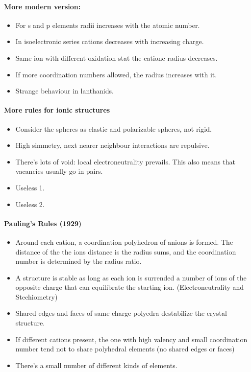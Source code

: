 \paragraph{More modern version: }

\begin{itemize}
    \item For s and p elements radii increases with the atomic number.
    \item In isoelectronic series cations decreases with increasing charge.
    \item Same ion with different oxidation stat the cationc radius decreases.
    \item If more coordination numbers allowed, the radius increases with it.
    \item Strange behaviour in lanthanids.
\end{itemize}

\paragraph{More rules for ionic structures}

\begin{itemize}
    \item Consider the spheres as elastic and polarizable spheres, not rigid.
    \item High simmetry, next nearer neighbour interactions are repulsive.
    \item There's lots of void: local electroneutrality prevails. This also means that vacancies usually go in pairs.
    \item Useless 1.
    \item Useless 2.
\end{itemize}

\paragraph{Pauling's Rules (1929)}

\begin{itemize}
    \item Around each cation, a coordination polyhedron of anions is formed. The distance of the the ions distance is the radius sums, and the coordination number is determined by the radius ratio.
    \item A structure is stable as long as each ion is surrended a number of ions of the opposite charge that can equilibrate the starting ion. (Electroneutrality and Stechiometry)
    \item Shared edges and faces of same charge polyedra destabilize the crystal structure.
    \item If different cations present, the one with high valency and small coordination number tend not to share polyhedral elements (no shared edges or faces)
    \item There's a small number of different kinds of elements.
\end{itemize}

